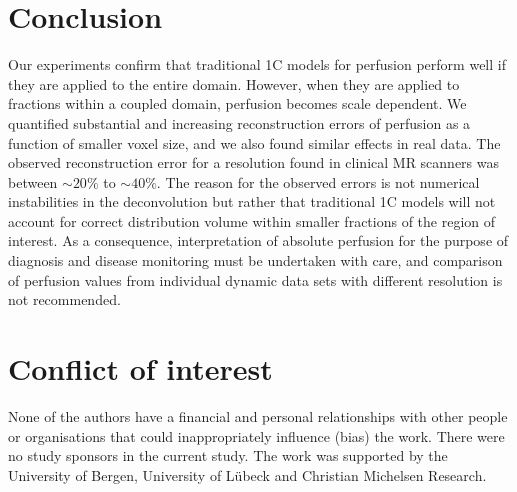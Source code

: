 \documentclass[final,5p,times,twocolumn]{elsarticle}
\begin{document}
	\section{Conclusion}
	Our experiments confirm that traditional 1C models for perfusion perform well if they are applied to the entire domain.
	However, when they are applied to fractions within a coupled domain, perfusion becomes scale dependent.
	We quantified substantial and increasing reconstruction errors of perfusion as a function of smaller voxel size, and we also found similar effects in real data. The observed reconstruction error for a resolution found in clinical MR scanners was between $\sim$$20\%$ to $\sim$$40\%$. The reason for the observed errors is not numerical instabilities in the deconvolution but rather that traditional 1C models will not account for correct distribution volume within smaller fractions of the region of interest. As a consequence, interpretation of absolute perfusion for the purpose of diagnosis and disease monitoring must be undertaken with care, and comparison of perfusion values from individual dynamic data sets with different resolution is not recommended. 

\section*{Conflict of interest}
None of the authors have a financial and personal relationships with other people or organisations that could inappropriately influence (bias) the work.
There were no study sponsors in the current study. The work was supported by the University of Bergen, University of L\"ubeck and Christian Michelsen Research.




 





\end{document}
